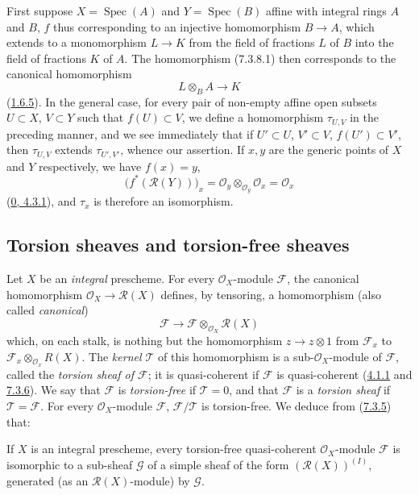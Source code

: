 First suppose $X=\operatorname{Spec}(A)$ and $Y=\operatorname{Spec}(B)$
affine with integral rings $A$ and $B$, $f$ thus corresponding to an injective
homomorphism $B\to A$, which extends to a monomorphism $L\to K$ from the field
of fractions $L$ of $B$ into the field of fractions $K$ of $A$. The
homomorphism (7.3.8.1) then corresponds to the canonical homomorphism
\[
  L\otimes_B A\to K
\]
(\hyperref[I.1.6.5]{1.6.5}). In the general case, for every pair of
non-empty affine open subsets $U\subset X$, $V\subset Y$ such that
$f(U)\subset V$, we define a homomorphism $\tau_{U,V}$ in the preceding
manner, and we see immediately that if $U'\subset U$, $V'\subset V$,
$f(U')\subset V'$, then $\tau_{U,V}$ extends $\tau_{U',V'}$, whence our
assertion. If $x,y$ are the generic points of $X$ and $Y$ respectively, we
have $f(x)=y$,
\[
  \bigl(f^*(\mathscr{R}(Y))\bigr)_x
  =\mathscr{O}_y\otimes_{\mathscr{O}_y}\mathscr{O}_x
  =\mathscr{O}_x
\]
(\hyperref[0.4.3.1]{0, 4.3.1}), and $\tau_x$ is therefore an isomorphism.

\subsection{Torsion sheaves and torsion-free sheaves}
\label{subsection:I.7.4}

\begin{env}[7.4.1]
\label{I.7.4.1}
Let $X$ be an \emph{integral} prescheme. For every $\mathscr{O}_X$-module
$\mathscr{F}$, the canonical homomorphism
$\mathscr{O}_X\to\mathscr{R}(X)$ defines, by tensoring, a homomorphism
(also called \emph{canonical})
\[
  \mathscr{F}\to
  \mathscr{F}\otimes_{\mathscr{O}_X}\mathscr{R}(X)
\]
which, on each stalk, is nothing but the homomorphism $z\to z\otimes 1$ from
$\mathscr{F}_x$ to
$\mathscr{F}_x\otimes_{\mathscr{O}_x}R(X)$. The \emph{kernel $\mathscr{T}$}
of this homomorphism is a sub-$\mathscr{O}_X$-module of $\mathscr{F}$,
called the \emph{torsion sheaf of $\mathscr{F}$}; it is quasi-coherent if
$\mathscr{F}$ is quasi-coherent
(\hyperref[I.4.1.1]{4.1.1} and \hyperref[I.7.3.6]{7.3.6}). We say that
$\mathscr{F}$ is \emph{torsion-free} if $\mathscr{T}=0$, and that
$\mathscr{F}$ is a \emph{torsion sheaf} if
$\mathscr{T}=\mathscr{F}$. For every $\mathscr{O}_X$-module $\mathscr{F}$,
$\mathscr{F}/\mathscr{T}$ is torsion-free. We deduce from
(\hyperref[I.7.3.5]{7.3.5}) that:
\end{env}

\begin{proposition}[7.4.2]
\label{I.7.4.2}
If $X$ is an integral prescheme, every torsion-free quasi-coherent
$\mathscr{O}_X$-module $\mathscr{F}$ is isomorphic to a sub-sheaf $\mathscr{G}$
of a simple sheaf of the form $(\mathscr{R}(X))^{(I)}$, generated (as an
$\mathscr{R}(X)$-module) by $\mathscr{G}$.
\end{proposition}

